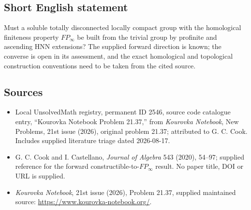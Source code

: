 \documentclass[11pt]{article}
\begin{document}
\subsection{Short English statement}
Must a soluble totally disconnected locally compact group with the homological finiteness property \(FP_\infty\) be built from the trivial group by profinite and ascending HNN extensions? The supplied forward direction is known; the converse is open in its assessment, and the exact homological and topological construction conventions need to be taken from the cited source.
\subsection{Sources}
\begin{itemize}
\item Local UnsolvedMath registry, permanent ID 2546, source code catalogue entry, ``Kourovka Notebook Problem 21.37,'' from \emph{Kourovka Notebook}, New Problems, 21st issue (2026), original problem 21.37; attributed to G. C. Cook. Includes supplied literature triage dated 2026-08-17.
\item G. C. Cook and I. Castellano, \emph{Journal of Algebra} 543 (2020), 54--97; supplied reference for the forward constructible-to-\(FP_\infty\) result. No paper title, DOI or URL is supplied.
\item \emph{Kourovka Notebook}, 21st issue (2026), Problem 21.37, supplied maintained source: \url{https://www.kourovka-notebook.org/}.
\end{itemize}
\end{document}
